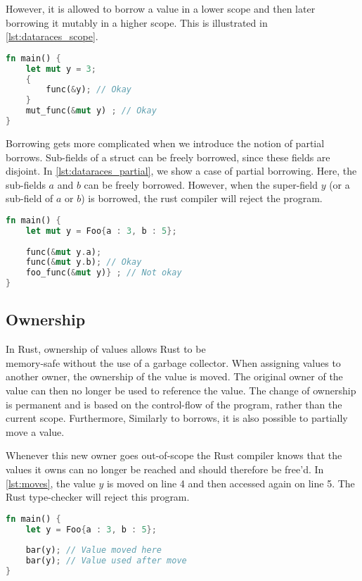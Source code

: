 However, it is allowed to borrow a value in a lower scope and then later borrowing it mutably in a higher scope. This is illustrated in \autoref{lst:dataraces_scope}.

 \begin{lstlisting}[language=rust, showstringspaces=false, escapechar=~, label={lst:dataraces_scope}, caption={Example of scoped borrow}]
fn main() { 
    let mut y = 3;
    {
        func(&y); // Okay
    }
    mut_func(&mut y) ; // Okay 
}
\end{lstlisting}

Borrowing gets more complicated when we introduce the notion of partial borrows. Sub-fields of a struct can be freely borrowed, since these fields are disjoint. In \autoref{lst:dataraces_partial}, we show a case of partial borrowing. Here, the sub-fields $a$ and $b$ can be freely borrowed. However, when the super-field $y$ (or a sub-field of $a$ or $b$) is borrowed, the rust compiler will reject the program.
 \begin{lstlisting}[language=rust, showstringspaces=false, escapechar=~, label={lst:dataraces_partial}, caption={Example of partial borrows}]
fn main() { 
    let mut y = Foo{a : 3, b : 5};
    
    func(&mut y.a);
    func(&mut y.b); // Okay
    foo_func(&mut y)} ; // Not okay 
}
\end{lstlisting}

\subsection{Ownership} \label{sec:ownership}
In Rust, ownership of values allows Rust to be\\ memory-safe without the use of a garbage collector\cite{rust_book_ownership}. When assigning values to another owner, the ownership of the value is moved. The original owner of the value can then no longer be used to reference the value. The change of ownership is permanent and is based on the control-flow of the program, rather than the current scope. Furthermore, Similarly to borrows, it is also possible to partially move a value.

Whenever this new owner goes out-of-scope the Rust compiler knows that the values it owns can no longer be reached and should therefore be free'd. 
In \autoref{lst:moves}, the value $y$ is moved on line 4 and then accessed again on line 5. The Rust type-checker will reject this program. 
    
\begin{lstlisting}[language=rust, showstringspaces=false, escapechar=~, label={lst:moves}, caption={Example of moving variables}]
fn main() { 
    let y = Foo{a : 3, b : 5};
    
    bar(y); // Value moved here
    bar(y); // Value used after move
}
\end{lstlisting}

